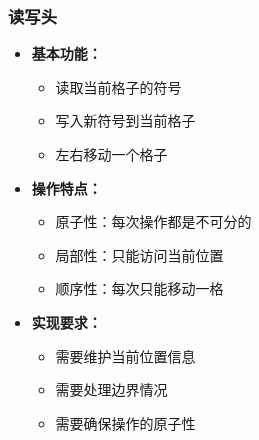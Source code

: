 \documentclass[a4paper,12pt]{ctexart}
\begin{document}
\subsubsection{读写头}
\begin{itemize}
    \item \textbf{基本功能：}
        \begin{itemize}
            \item 读取当前格子的符号
            \item 写入新符号到当前格子
            \item 左右移动一个格子
        \end{itemize}
    \item \textbf{操作特点：}
        \begin{itemize}
            \item 原子性：每次操作都是不可分的
            \item 局部性：只能访问当前位置
            \item 顺序性：每次只能移动一格
        \end{itemize}
    \item \textbf{实现要求：}
        \begin{itemize}
            \item 需要维护当前位置信息
            \item 需要处理边界情况
            \item 需要确保操作的原子性
        \end{itemize}
\end{itemize}
\end{document}
